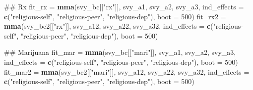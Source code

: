 \documentclass[]{DissertateUSU}
\newenvironment{Shaded}{\begin{snugshade}}{\end{snugshade}}
\newcommand{\KeywordTok}[1]{\textcolor[rgb]{0.13,0.29,0.53}{\textbf{#1}}}
\newcommand{\DataTypeTok}[1]{\textcolor[rgb]{0.13,0.29,0.53}{#1}}
\newcommand{\DecValTok}[1]{\textcolor[rgb]{0.00,0.00,0.81}{#1}}
\newcommand{\StringTok}[1]{\textcolor[rgb]{0.31,0.60,0.02}{#1}}
\newcommand{\NormalTok}[1]{#1}
\begin{document}
\begin{Shaded}
\begin{Highlighting}[]
\NormalTok{## Rx}
\NormalTok{fit_rx =}\StringTok{ }\KeywordTok{mma}\NormalTok{(svy_bc[[}\StringTok{"rx"}\NormalTok{]],}
\NormalTok{              svy_a1,}
\NormalTok{              svy_a2,}
\NormalTok{              svy_a3,}
              \DataTypeTok{ind_effects =} \KeywordTok{c}\NormalTok{(}\StringTok{"religious-self"}\NormalTok{,}
                              \StringTok{"religious-peer"}\NormalTok{,}
                              \StringTok{"religious-dep"}\NormalTok{),}
              \DataTypeTok{boot =} \DecValTok{500}\NormalTok{)}
\NormalTok{fit_rx2 =}\StringTok{ }\KeywordTok{mma}\NormalTok{(svy_bc2[[}\StringTok{"rx"}\NormalTok{]],}
\NormalTok{               svy_a12,}
\NormalTok{               svy_a22,}
\NormalTok{               svy_a32,}
               \DataTypeTok{ind_effects =} \KeywordTok{c}\NormalTok{(}\StringTok{"religious-self"}\NormalTok{,}
                               \StringTok{"religious-peer"}\NormalTok{,}
                               \StringTok{"religious-dep"}\NormalTok{),}
               \DataTypeTok{boot =} \DecValTok{500}\NormalTok{)}

\NormalTok{## Marijuana}
\NormalTok{fit_mar =}\StringTok{ }\KeywordTok{mma}\NormalTok{(svy_bc[[}\StringTok{"mari"}\NormalTok{]],}
\NormalTok{             svy_a1,}
\NormalTok{             svy_a2,}
\NormalTok{             svy_a3,}
             \DataTypeTok{ind_effects =} \KeywordTok{c}\NormalTok{(}\StringTok{"religious-self"}\NormalTok{,}
                             \StringTok{"religious-peer"}\NormalTok{,}
                             \StringTok{"religious-dep"}\NormalTok{),}
             \DataTypeTok{boot =} \DecValTok{500}\NormalTok{)}
\NormalTok{fit_mar2 =}\StringTok{ }\KeywordTok{mma}\NormalTok{(svy_bc2[[}\StringTok{"mari"}\NormalTok{]],}
\NormalTok{              svy_a12,}
\NormalTok{              svy_a22,}
\NormalTok{              svy_a32,}
              \DataTypeTok{ind_effects =} \KeywordTok{c}\NormalTok{(}\StringTok{"religious-self"}\NormalTok{,}
                              \StringTok{"religious-peer"}\NormalTok{,}
                              \StringTok{"religious-dep"}\NormalTok{),}
              \DataTypeTok{boot =} \DecValTok{500}\NormalTok{)}


\end{Highlighting}
\end{Shaded}
\end{document}
